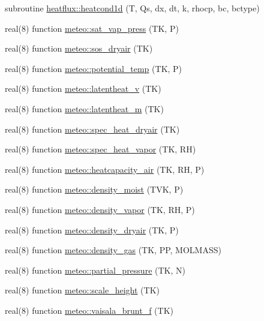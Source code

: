 \begin{DoxyCompactItemize}
subroutine \hyperlink{namespaceheatflux_a44a99e2a4ba173804ec1adf16608a8b2}{heatflux\+::heatcond1d} (T, Qs, dx, dt, k, rhocp, bc, bctype)
\item 
real(8) function \hyperlink{namespacemeteo_a6777852efdfd10f05bb7467fd99f03ec}{meteo\+::sat\+\_\+vap\+\_\+press} (TK, P)
\item 
real(8) function \hyperlink{namespacemeteo_a799c55d98d43606ee55dfcb2ed973c02}{meteo\+::sos\+\_\+dryair} (TK)
\item 
real(8) function \hyperlink{namespacemeteo_a537068a2255cff524747621cd522b93a}{meteo\+::potential\+\_\+temp} (TK, P)
\item 
real(8) function \hyperlink{namespacemeteo_afaaf9cd39b3f9994813ea6197d3a74bf}{meteo\+::latentheat\+\_\+v} (TK)
\item 
real(8) function \hyperlink{namespacemeteo_a57634c251a493116d57d49865d95c7a6}{meteo\+::latentheat\+\_\+m} (TK)
\item 
real(8) function \hyperlink{namespacemeteo_a1db0e89d35e5eae20acb839111603927}{meteo\+::spec\+\_\+heat\+\_\+dryair} (TK)
\item 
real(8) function \hyperlink{namespacemeteo_a2458549db90b31c67886950a36fe2370}{meteo\+::spec\+\_\+heat\+\_\+vapor} (TK, RH)
\item 
real(8) function \hyperlink{namespacemeteo_a1c0a3877fc85ffd63bbf91b3e710b602}{meteo\+::heatcapacity\+\_\+air} (TK, RH, P)
\item 
real(8) function \hyperlink{namespacemeteo_afeb4cd9d5827418a587e1b78093b08f5}{meteo\+::density\+\_\+moist} (T\+VK, P)
\item 
real(8) function \hyperlink{namespacemeteo_a4a51e0e5cdc190c3e5eccdb69c267382}{meteo\+::density\+\_\+vapor} (TK, RH, P)
\item 
real(8) function \hyperlink{namespacemeteo_a2d3b6838da7330c4e146845991c0bc8a}{meteo\+::density\+\_\+dryair} (TK, P)
\item 
real(8) function \hyperlink{namespacemeteo_a5c26a948b622d4d5ffd1f16f755e3c96}{meteo\+::density\+\_\+gas} (TK, PP, M\+O\+L\+M\+A\+SS)
\item 
real(8) function \hyperlink{namespacemeteo_a0171c7d6a68810bdaa89cb39c92ee96f}{meteo\+::partial\+\_\+pressure} (TK, N)
\item 
real(8) function \hyperlink{namespacemeteo_ad07039dc16c44b421a37a93ec073d7ac}{meteo\+::scale\+\_\+height} (TK)
\item 
real(8) function \hyperlink{namespacemeteo_a60b3a3a3f1d7b40ed8b9fd4b55a9e06b}{meteo\+::vaisala\+\_\+brunt\+\_\+f} (TK)
\end{DoxyCompactItemize}
